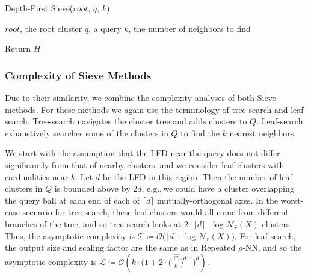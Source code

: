 \begin{minipage}{0.425\textwidth}
    \begin{algorithm}[H]\small
        \caption{Depth-First Sieve($root$, $q$, $k$)}
        \label{alg:methods:depth-first-sieve}
        \begin{algorithmic}
            \Require $root$, the root cluster
            \Require $q$, a query
            \Require $k$, the number of neighbors to find


                \EndWhile
                \EndFor
                \EndWhile
            \EndWhile
            \State Return $H$
        \end{algorithmic}
    \end{algorithm}
\end{minipage}


\subsubsection{Complexity of Sieve Methods}
\label{sec:methods:knn-search:complexity-of-sieve-methods}

Due to their similarity, we combine the complexity analyses of both Sieve methods.
For these methods we again use the terminology of tree-search and leaf-search.
Tree-search navigates the cluster tree and adds clusters to $Q$.
Leaf-search exhaustively searches some of the clusters in $Q$ to find the $k$ nearest neighbors.

We start with the assumption that the LFD near the query does not differ significantly from that of nearby clusters, and we consider leaf clusters with cardinalities near $k$.
Let $d$ be the LFD in this region.
Then the number of leaf-clusters in $Q$ is bounded above by $2d$, e.g.,\,we could have a cluster overlapping the query ball at each end of each of $\lceil d \rceil$ mutually-orthogonal axes.
In the worst-case scenario for tree-search, these leaf clusters would all come from different branches of the tree, and so tree-search looks at $2 \cdot \lceil d \rceil \cdot \log \mathcal{N}_{\hat{r}}(X)$ clusters.
Thus, the asymptotic complexity is $\mathcal{T} \coloneqq \mathcal{O} \big( \lceil d \rceil \cdot \log \mathcal{N}_{\hat{r}}(X) \big)$.
For leaf-search, the output size and scaling factor are the same as in Repeated $\rho$-NN, and so the asymptotic complexity is $\mathcal{L} \coloneqq \mathcal{O} \left( k \cdot \bigg( 1 + 2 \cdot \Big( \frac{\hat{|C|}}{k} \Big) ^ {d^{-1}} \bigg)^d \right)$.

